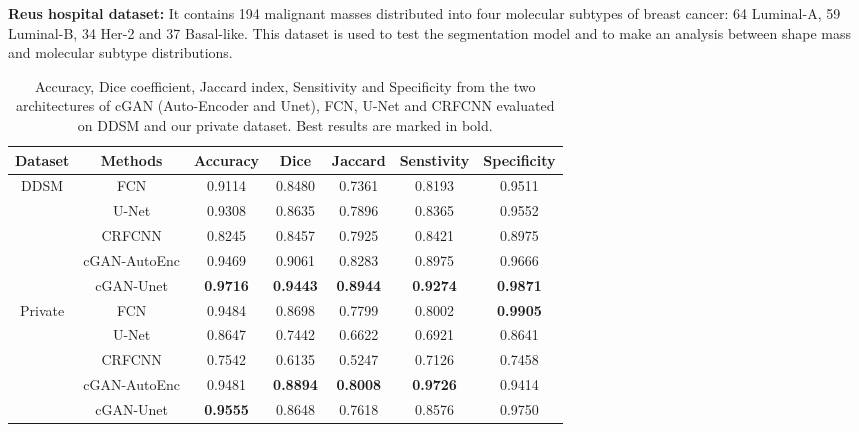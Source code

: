 \documentclass[runningheads,a4paper]{llncs}
\begin{document}
\textbf{Reus hospital dataset:} It contains 194 malignant masses distributed into four molecular subtypes of breast cancer: 64 Luminal-A, 59 Luminal-B, 34 Her-2 and 37 Basal-like. This dataset is used to test the segmentation model and to make an analysis between shape mass and molecular subtype distributions.

\begin{table}[!b]
\centering
\caption{Accuracy, Dice coefficient, Jaccard index, Sensitivity and Specificity from the two architectures of cGAN (Auto-Encoder and Unet), FCN, U-Net and CRFCNN evaluated on DDSM and our private dataset. Best results are marked in bold.}
\label{Table1}
\begin{tabular}{|c|c|c|c|c|c|c|}
\hline
Dataset                      & Methods         & Accuracy        & Dice            & Jaccard         & Senstivity      & Specificity     \\ \hline
\multirow{5}{*}{DDSM}        & FCN             & 0.9114          & 0.8480          & 0.7361          & 0.8193          & 0.9511          \\ \cline{2-7}
                             & U-Net           & 0.9308          & 0.8635          & 0.7896          & 0.8365          & 0.9552          \\ \cline{2-7}
                             & CRFCNN          & 0.8245          & 0.8457          & 0.7925          & 0.8421          & 0.8975          \\ \cline{2-7}
                             & cGAN-AutoEnc     & 0.9469          & 0.9061          & 0.8283          & 0.8975          & 0.9666          \\ \cline{2-7}
                             & cGAN-Unet        & \textbf{0.9716} & \textbf{0.9443} & \textbf{0.8944} & \textbf{0.9274} & \textbf{0.9871} \\ \hline
\multirow{5}{*}{Private}     & FCN             & 0.9484          & 0.8698          & 0.7799          & 0.8002          & \textbf{0.9905} \\ \cline{2-7}
                             & U-Net           & 0.8647          & 0.7442          & 0.6622          & 0.6921          & 0.8641          \\ \cline{2-7}
                             & CRFCNN          & 0.7542          & 0.6135          & 0.5247          & 0.7126          & 0.7458          \\ \cline{2-7}
                             & cGAN-AutoEnc     & 0.9481          & \textbf{0.8894} & \textbf{0.8008} & \textbf{0.9726} & 0.9414          \\ \cline{2-7}
                             & cGAN-Unet        & \textbf{0.9555} & 0.8648          & 0.7618          & 0.8576          & 0.9750          \\ \hline


\end{tabular}
\end{table}
\end{document}
